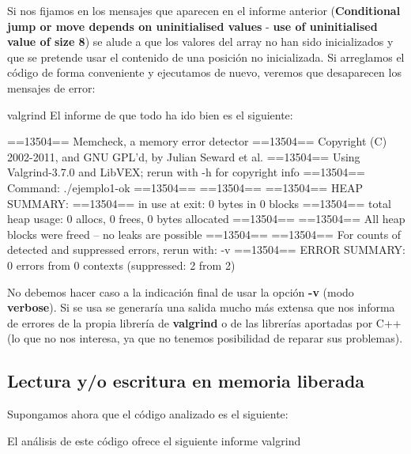 \documentclass[11pt,a4paper,professionalfonts]{article}
\begin{document}
Si nos fijamos en los mensajes que aparecen en el informe anterior 
(\textbf{Conditional jump or move depends on uninitialised values} - 
\textbf{use of uninitialised value of size 8}) se alude a que los valores 
del array no han sido inicializados y que se pretende usar el contenido de 
una posición no inicializada. Si arreglamos el código de forma conveniente y
ejecutamos de nuevo, veremos que desaparecen los mensajes de error:

valgrind
El informe de que todo ha ido bien es el siguiente:

\vspace{0.4cm}
\begin{javacode}
==13504== Memcheck, a memory error detector
==13504== Copyright (C) 2002-2011, and GNU GPL'd, by Julian Seward et al.
==13504== Using Valgrind-3.7.0 and LibVEX; rerun with -h for copyright info
==13504== Command: ./ejemplo1-ok
==13504== 
==13504== 
==13504== HEAP SUMMARY:
==13504==     in use at exit: 0 bytes in 0 blocks
==13504==   total heap usage: 0 allocs, 0 frees, 0 bytes allocated
==13504== 
==13504== All heap blocks were freed -- no leaks are possible
==13504== 
==13504== For counts of detected and suppressed errors, rerun with: -v
==13504== ERROR SUMMARY: 0 errors from 0 contexts (suppressed: 2 from 2)
\end{javacode}
\vspace{0.4cm}

No debemos hacer caso a la indicación final de usar la opción \textbf{-v} (modo
\textbf{verbose}). Si se usa se generaría una salida mucho más extensa que nos informa
de errores de la propia librería de \textbf{valgrind} o de las librerías aportadas
por C++ (lo que no nos interesa, ya que no tenemos posibilidad de reparar sus
problemas).

\subsection{Lectura y/o escritura en memoria liberada}

Supongamos ahora que el código analizado es el siguiente:


El análisis de este código ofrece el siguiente informe valgrind
\end{document}
